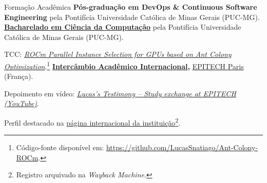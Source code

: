 \begin{rubric}{Formação Acadêmica}
\entry*[2026 -- presente]%
    \textbf{Pós-graduação em DevOps \& Continuous Software Engineering} pela Pontifícia Universidade Católica de Minas Gerais (PUC-MG).
%
\entry*[2019 -- 2023]%
    \textbf{\href{https://drive.google.com/file/d/1kEO3Hz0_RRPwcrQ826onq0AbHIuZv9iR/view?usp=sharing}{Bacharelado em Ciência da Computação}} pela Pontifícia Universidade Católica de Minas Gerais (PUC-MG).
    \par TCC: \emph{\href{https://github.com/LucasSnatiago/TCC/raw/main/main.pdf}{ROCm Parallel Instance Selection for GPUs based on Ant Colony Optimization}}.\footnote{Código-fonte disponível em: \href{https://github.com/LucasSnatiago/Ant-Colony-ROCm}{https://github.com/LucasSnatiago/Ant-Colony-ROCm}.}
%
\entry*[2023]%
    \textbf{\href{https://drive.google.com/file/d/18yGVDfS8qOwmM7TXN-m8jqI3r0iMvm-3/view?usp=sharing}{Intercâmbio Acadêmico Internacional},} \href{https://epitech.eu/}{EPITECH Paris} (França).
    \par Depoimento em vídeo: \href{https://youtu.be/rOP5lxGcNaE}{\emph{Lucas's Testimony -- Study exchange at EPITECH (YouTube)}}.
    \par Perfil destacado na \href{https://web.archive.org/web/20250407145959/https://international.epitech.eu/#h-voices-of-our-international-students}{página internacional da instituição}\footnote{Registro arquivado na \emph{Wayback Machine}.}.
%
\end{rubric}
